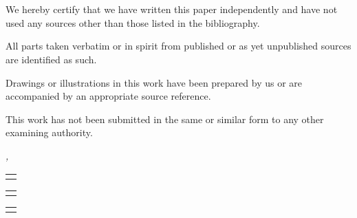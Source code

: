 \chapter*{}
\thispagestyle{empty}
We hereby certify that we have written this paper independently and
have not used any sources other than those listed in the bibliography.
\medskip

\noindent
All parts taken verbatim or in spirit from published or as yet
unpublished sources are identified as such.
\medskip

\noindent
Drawings or illustrations in this work have been prepared by us or
are accompanied by an appropriate source reference.
\medskip

\noindent
This work has not been submitted in the same or similar form to any
other examining authority. 
\bigskip

\noindent\textit{\myLocation{}, \myTime{}}

\smallskip

\begin{flushright}
    \begin{tabular}{m{4cm}}
        \\ \hline{}
        \centering\myNameK{}\\
    \end{tabular}
\end{flushright}
\begin{flushright}
    \begin{tabular}{m{4cm}}
        \\ \hline{}
        \centering\myNameM{}\\
    \end{tabular}
\end{flushright}
\begin{flushright}
    \begin{tabular}{m{4cm}}
        \\ \hline{}
        \centering\myNameH{}\\
    \end{tabular}
\end{flushright}
